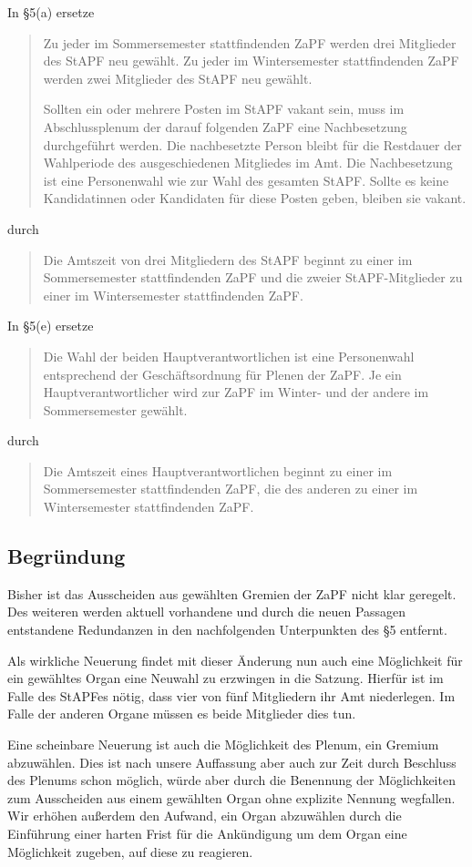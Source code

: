 \documentclass[draft,10pt,oneside]{scrartcl}
\begin{document}
In §5(a) ersetze
\begin{quote}
	Zu jeder im Sommersemester stattfindenden ZaPF werden drei Mitglieder des StAPF
	neu gewählt.
	Zu jeder im Wintersemester stattfindenden ZaPF werden zwei Mitglieder des StAPF
	neu gewählt.

	Sollten ein oder mehrere Posten im StAPF vakant sein, muss im Abschlussplenum der
	darauf folgenden ZaPF eine Nachbesetzung durchgeführt werden.
	Die nachbesetzte Person bleibt für die Restdauer der Wahlperiode des
	ausgeschiedenen Mitgliedes im Amt.
	Die Nachbesetzung ist eine Personenwahl wie zur Wahl des gesamten StAPF.
	Sollte es keine Kandidatinnen oder Kandidaten für diese Posten geben, bleiben
	sie vakant.
\end{quote}
durch
\begin{quote}
	Die Amtszeit von drei Mitgliedern des StAPF beginnt zu einer im Sommersemester
	stattfindenden ZaPF und die zweier StAPF-Mitglieder zu einer im Wintersemester
	stattfindenden ZaPF.
\end{quote}
\vspace{0.25cm}

In §5(e) ersetze
\begin{quote}
	Die Wahl der beiden Hauptverantwortlichen ist eine Personenwahl entsprechend der
	Geschäftsordnung für Plenen der ZaPF.  Je ein Hauptverantwortlicher wird zur
	ZaPF im Winter- und der andere im Sommersemester gewählt.
\end{quote}
durch
\begin{quote}
	Die Amtszeit eines Hauptverantwortlichen beginnt zu einer im Sommersemester
	stattfindenden ZaPF, die des anderen zu einer im Wintersemester stattfindenden
	ZaPF.
\end{quote}

\subsection*{Begründung}

Bisher ist das Ausscheiden aus gewählten Gremien der ZaPF nicht klar geregelt.
Des weiteren werden aktuell vorhandene und durch die neuen Passagen entstandene
Redundanzen in den nachfolgenden Unterpunkten des §5 entfernt.

Als wirkliche Neuerung findet mit dieser Änderung nun auch eine Möglichkeit für
ein gewähltes Organ eine Neuwahl zu erzwingen in die Satzung. Hierfür ist im
Falle des StAPFes nötig, dass vier von fünf Mitgliedern ihr Amt niederlegen. Im
Falle der anderen Organe müssen es beide Mitglieder dies tun.

Eine scheinbare Neuerung ist auch die Möglichkeit des Plenum, ein Gremium
abzuwählen. Dies ist nach unsere Auffassung aber auch zur Zeit durch Beschluss
des Plenums schon möglich, würde aber durch die Benennung der Möglichkeiten zum
Ausscheiden aus einem gewählten Organ ohne explizite Nennung wegfallen. Wir
erhöhen außerdem den Aufwand, ein Organ abzuwählen durch die Einführung einer
harten Frist für die Ankündigung um dem Organ eine Möglichkeit zugeben, auf
diese zu reagieren.
\end{document}
